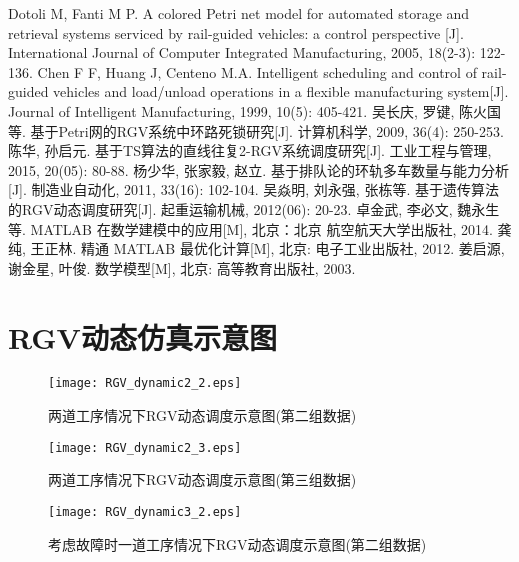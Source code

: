 \documentclass[no-math,withoutpreface,bwprint]{cumcmthesis} %
\numberwithin{equation}{section}
\numberwithin{figure}{section}
\numberwithin{table}{section}
\renewcommand{\thefigure}{\arabic{section}-\arabic{figure}}
\begin{document}
\newpage
\begin{thebibliography}{9}%
  Dotoli M, Fanti M P. A colored Petri net model for automated storage and retrieval systems serviced by rail-guided vehicles: a control perspective [J]. International Journal of Computer Integrated Manufacturing, 2005, 18(2-3): 122-136.
  Chen F F, Huang J, Centeno M.A. Intelligent scheduling and control of rail-guided vehicles and load/unload operations in a flexible manufacturing system[J]. Journal of Intelligent Manufacturing, 1999, 10(5): 405-421. 
  吴长庆, 罗键, 陈火国等. 基于Petri网的RGV系统中环路死锁研究[J]. 计算机科学, 2009, 36(4): 250-253.
  陈华, 孙启元. 基于TS算法的直线往复2-RGV系统调度研究[J]. 工业工程与管理,   2015, 20(05): 80-88.
 杨少华, 张家毅, 赵立. 基于排队论的环轨多车数量与能力分析[J]. 制造业自动化, 2011, 33(16): 102-104.
 吴焱明, 刘永强, 张栋等. 基于遗传算法的RGV动态调度研究[J]. 起重运输机械, 2012(06): 20-23.
卓金武, 李必文, 魏永生等. MATLAB 在数学建模中的应用[M], 北京：北京 航空航天大学出版社, 2014.
龚纯, 王正林. 精通 MATLAB 最优化计算[M], 北京: 电子工业出版社, 2012.
姜启源, 谢金星, 叶俊. 数学模型[M], 北京: 高等教育出版社, 2003.
\end{thebibliography}

\newpage
\appendix
\renewcommand{\thefigure}{\Alph{section}-\arabic{figure}}
\section{RGV动态仿真示意图}

\begin{figure}[H]
	\hspace{-0.5cm}
	\texttt{[image: RGV\_dynamic2\_2.eps]}
	\caption{两道工序情况下RGV动态调度示意图(第二组数据)}
\end{figure}

\begin{figure}[H]
	\hspace{-0.5cm}
	\texttt{[image: RGV\_dynamic2\_3.eps]}
	\caption{两道工序情况下RGV动态调度示意图(第三组数据)}
\end{figure}

\begin{figure}[H]
	\hspace{-0.5cm}
	\texttt{[image: RGV\_dynamic3\_2.eps]}
	\caption{考虑故障时一道工序情况下RGV动态调度示意图(第二组数据)}
\end{figure}
\end{document}
